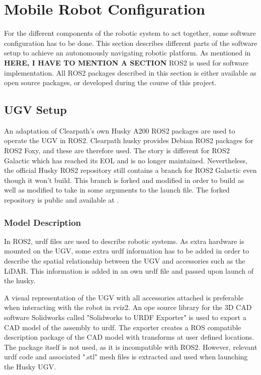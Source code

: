 \section{Mobile Robot Configuration}
For the different components of the robotic system to act together, some software configuration has to be done. This section describes different  parts of the software setup to achieve an autonomously navigating robotic platform. As mentioned in \textbf{HERE, I HAVE TO MENTION A SECTION} ROS2 is used for software implementation. All ROS2 packages described in this section is either available as open source packages, or developed during the course of this project.

\subsection{UGV Setup}
An adaptation of Clearpath's own Husky A200 ROS2 packages are used to operate the UGV in ROS2. Clearpath husky provides Debian ROS2 packages for ROS2 Foxy, and these are therefore used. The story is different for ROS2 Galactic which has reached its EOL and is no longer maintained. Nevertheless, the official Husky ROS2 repository\cite{husky_repo} still contains a branch for ROS2 Galactic even though it won't build. This branch is forked and modified in order to build as well as modified to take in some arguments to the launch file. The forked repository is public and available at \cite{uia_husky_repo}. 

\subsubsection{Model Description} \label{sec:M:CS:UGV:S:ModelDescription}
In ROS2, urdf files are used to describe robotic systems. As extra hardware is mounted on the UGV, some extra urdf information has to be added in order to describe the spatial relationship between the UGV and accessories such as the LiDAR. This information is added in an own urdf file and passed upon launch of the husky.

A visual representation of the UGV with all accessories attached is preferable when interacting with the robot in rviz2. An ope source library for the 3D CAD software Solidworks called "Solidworks to URDF Exporter" \cite{urdf_exporter} is used to export a CAD model of the assembly to urdf. The exporter creates a ROS compatible description package of the CAD model with transforms at user defined locations. The package itself is not used, as it is incompatible with ROS2. However, relevant urdf code and associated ".stl" mesh files is extracted and used when launching the Husky UGV.

